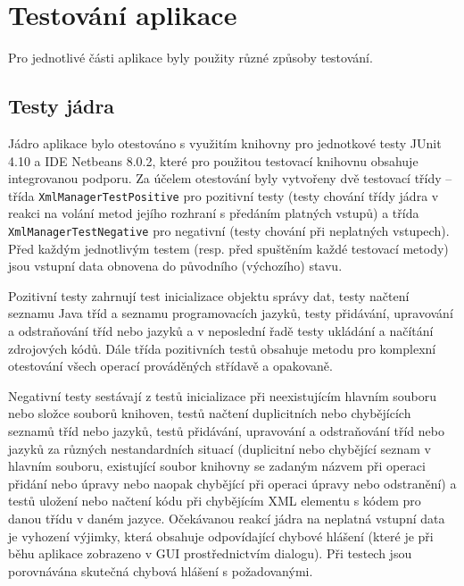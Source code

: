 \documentclass[onepage, a4paper, 12pt]{bakalarka}
\begin{document}
\section{Testování aplikace}
Pro jednotlivé části aplikace byly použity různé způsoby testování.

\subsection{Testy jádra}
Jádro aplikace bylo otestováno s využitím knihovny pro jednotkové testy JUnit 4.10 a IDE Netbeans 8.0.2, které pro použitou testovací knihovnu obsahuje integrovanou podporu. Za účelem otestování byly vytvořeny dvě testovací třídy -- třída \texttt{XmlManagerTestPositive} pro pozitivní testy (testy chování třídy jádra v reakci na volání metod jejího rozhraní s předáním platných vstupů) a třída \texttt{XmlManagerTestNegative} pro negativní (testy chování při neplatných vstupech). Před každým jednotlivým testem (resp. před spuštěním každé testovací metody) jsou vstupní data obnovena do původního (výchozího) stavu.\par
Pozitivní testy zahrnují test inicializace objektu správy dat, testy načtení seznamu Java tříd a seznamu programovacích jazyků, testy přidávání, upravování a odstraňování tříd nebo jazyků a v neposlední řadě testy ukládání a načítání zdrojových kódů. Dále třída pozitivních testů obsahuje metodu pro komplexní otestování všech operací prováděných střídavě a opakovaně.\par
Negativní testy sestávají z testů inicializace při neexistujícím hlavním souboru nebo složce souborů knihoven, testů načtení duplicitních nebo chybějících seznamů tříd nebo jazyků, testů přidávání, upravování a odstraňování tříd nebo jazyků za různých nestandardních situací (duplicitní nebo chybějící seznam v hlavním souboru, existující soubor knihovny se zadaným názvem při operaci přidání nebo úpravy nebo naopak chybějící při operaci úpravy nebo odstranění) a testů uložení nebo načtení kódu při chybějícím XML elementu s kódem pro danou třídu v daném jazyce. Očekávanou reakcí jádra na neplatná vstupní data je vyhození výjimky, která obsahuje odpovídající chybové hlášení (které je při běhu aplikace zobrazeno v GUI prostřednictvím dialogu). Při testech jsou porovnávána skutečná chybová hlášení s požadovanými.
\end{document}
